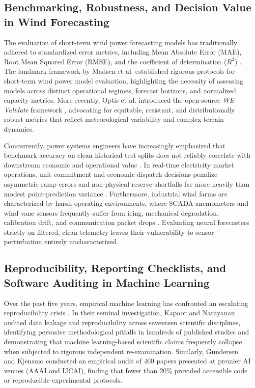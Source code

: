 \documentclass[preprint,3p,times]{elsarticle}
\begin{document}
\subsection{Benchmarking, Robustness, and Decision Value in Wind Forecasting}
The evaluation of short-term wind power forecasting models has traditionally adhered to standardized error metrics, including Mean Absolute Error (MAE), Root Mean Squared Error (RMSE), and the coefficient of determination ($R^2$) \cite{madsen2005,optis2022}. The landmark framework by Madsen et al. \cite{madsen2005} established rigorous protocols for short-term wind power model evaluation, highlighting the necessity of assessing models across distinct operational regimes, forecast horizons, and normalized capacity metrics. More recently, Optis et al. introduced the open-source \textit{WE-Validate} framework \cite{optis2022}, advocating for equitable, resistant, and distributionally robust metrics that reflect meteorological variability and complex terrain dynamics.

Concurrently, power systems engineers have increasingly emphasized that benchmark accuracy on clean historical test splits does not reliably correlate with downstream economic and operational value \cite{weron2014,zhang2014wind}. In real-time electricity market operations, unit commitment and economic dispatch decisions penalize asymmetric ramp errors and non-physical reserve shortfalls far more heavily than modest point-prediction variance \cite{dao2018cointegration}. Furthermore, industrial wind farms are characterized by harsh operating environments, where SCADA anemometers and wind vane sensors frequently suffer from icing, mechanical degradation, calibration drift, and communication packet drops \cite{leahy2019dataquality}. Evaluating neural forecasters strictly on filtered, clean telemetry leaves their vulnerability to sensor perturbation entirely uncharacterized.

\subsection{Reproducibility, Reporting Checklists, and Software Auditing in Machine Learning}
Over the past five years, empirical machine learning has confronted an escalating reproducibility crisis \cite{pineau2021,gundersen2018,kapoor2023}. In their seminal investigation, Kapoor and Narayanan \cite{kapoor2023} audited data leakage and reproducibility across seventeen scientific disciplines, identifying pervasive methodological pitfalls in hundreds of published studies and demonstrating that machine learning-based scientific claims frequently collapse when subjected to rigorous independent re-examination. Similarly, Gundersen and Kjensmo \cite{gundersen2018} conducted an empirical audit of 400 papers presented at premier AI venues (AAAI and IJCAI), finding that fewer than 20\% provided accessible code or reproducible experimental protocols.
\end{document}
